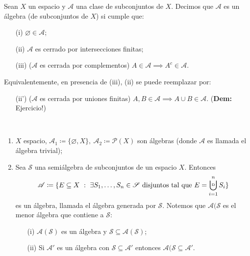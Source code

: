 	\begin{definition}[álgebra]
		Sean $X$ un espacio y $\mathscr{A}$ una clase de subconjuntos de $X$. Decimos que $\mathscr{A}$ es un álgebra (de subconjuntos de $X$) si cumple que:
		\begin{enumerate}
			\item[(i)] $\varnothing \in \mathscr{A}$;
			
			\item[(ii)] $\mathscr{A}$ es cerrado por intersecciones finitas;

			\item[(iii)] ($\mathscr{A}$ es cerrada por complementos) $A \in \mathscr{A} \implies A^c \in \mathscr{A}$. 
		\end{enumerate}	
			\noindent Equivalentemente, en presencia de (iii), (ii) se puede reemplazar por:	
		\begin{enumerate}
			\item[(ii')] ($\mathscr{A}$ es cerrada por uniones finitas) $A,B\in \mathscr{A} \implies A \cup B \in \mathscr{A}$. (\textbf{Dem:} Ejercicio!)
		\end{enumerate}
	\end{definition}

	\begin{eg}~
		\begin{enumerate}
			\item $X$ espacio, $\mathscr{A}_1 \coloneq \{\varnothing, X\},\ \mathscr{A}_2 \coloneq \mathcal{P}(X)$ son álgebras (donde $\mathscr{A}$ es llamada el álgebra trivial);

			\item Sea $\mathscr{S}$ una semiálgebra de subconjuntos de un espacio $X$. Entonces 
			\[ \mathscr{A} \coloneq \{ E \subseteq X \ : \ \exists S_1,\dots,S_n \in \mathscr{S} \text{ disjuntos tal que } E = \displaystyle\bigcupd_{i=1}^{n} S_i \} \] 
			es un álgebra, llamada el álgebra generada por $\mathscr{S}$. Notemos que $\mathscr{A}(\mathscr{S}$ es el menor álgebra que contiene a $\mathscr{S}$:
			\begin{enumerate}
				\item[(i)] $\mathscr{A}(\mathscr{S})$ es un álgebra y $\mathscr{S} \subseteq \mathscr{A}(\mathscr{S})$;

				\item[(ii)] Si $\mathscr{A}'$ es un álgebra con $\mathscr{S} \subseteq \mathscr{A}'$ entonces $\mathscr{A}(\mathscr{S} \subseteq \mathscr{A}'$.
			\end{enumerate}
		\end{enumerate}
	\end{eg}

